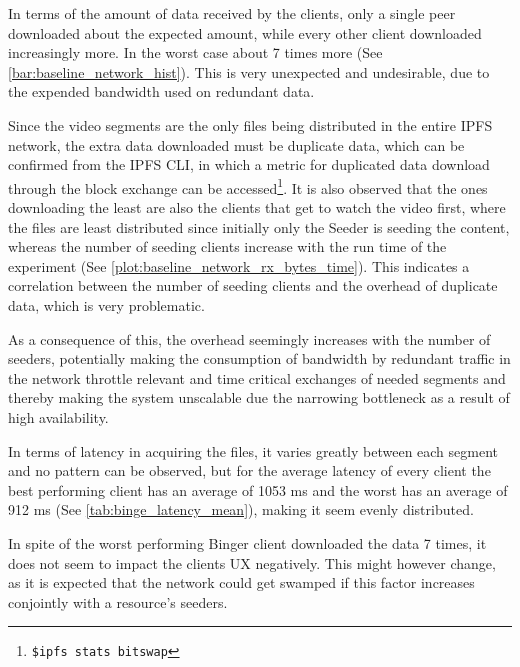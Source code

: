 In terms of the amount of data received by the clients, only a single peer downloaded about the expected amount, while every other client downloaded increasingly more. In the worst case about 7 times more (See \autoref{bar:baseline_network_hist}). This is very unexpected and undesirable, due to the expended bandwidth used on redundant data.

\if{}

\fi

Since the video segments are the only files being distributed in the entire \ac{IPFS} network, the extra data downloaded must be duplicate data, which can be confirmed from the \ac{IPFS} \ac{CLI}, in which a metric for duplicated data download through the block exchange can be accessed\footnote{\texttt{\$ipfs stats bitswap}}. It is also observed that the ones downloading the least are also the clients that get to watch the video first, where the files are least distributed since initially only the Seeder is seeding the content, whereas the number of seeding clients increase with the run time of the experiment (See \autoref{plot:baseline_network_rx_bytes_time}). This indicates a correlation between the number of seeding clients and the overhead of duplicate data, which is very problematic.

As a consequence of this, the overhead seemingly increases with the number of seeders, potentially making the consumption of bandwidth by redundant traffic in the network throttle relevant and time critical exchanges of needed segments and thereby making the system unscalable due the narrowing bottleneck as a result of high availability.

\if{}

\fi

In terms of latency in acquiring the files, it varies greatly between each segment and no pattern can be observed, but for the average latency of every client the best performing client has an average of 1053 \ac{ms} and the worst has an average of 912 \ac{ms} (See \autoref{tab:binge_latency_mean}), making it seem evenly distributed.

\if{}

\fi

In spite of the worst performing Binger client downloaded the data 7 times, it does not seem to impact the clients \ac{UX} negatively. This might however change, as it is expected that the network could get swamped if this factor increases conjointly with a resource's seeders.

